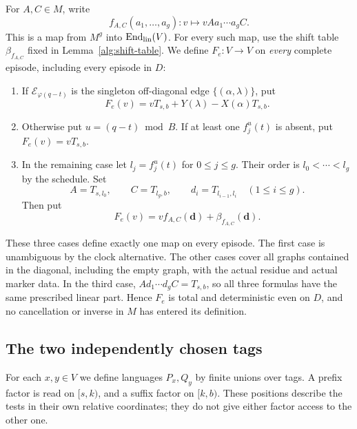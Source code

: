 For $A,C\in M$, write
\begin{equation}
 f_{A,C}(a_1,\ldots,a_g)\colon
 v\longmapsto vA a_1\cdots a_g C.
 \label{outer:product-table}
\end{equation}
This is a map from $M^g$ into $\operatorname{End}_{\rm lin}(V)$.
For every such map, use the shift table $\beta_{f_{A,C}}$ fixed in
Lemma~\ref{alg:shift-table}.  We define $F_e\colon V\to V$ on
\emph{every} complete episode, including every episode in $D$:
\begin{enumerate}
\item If $\mathcal E_{\varphi(q-t)}$ is the singleton off-diagonal edge
      $\{(\alpha,\lambda)\}$, put
      \begin{equation}
      F_e(v)=vT_{s,b}+Y(\lambda)-X(\alpha)T_{s,b}.
      \label{outer:off-diagonal-update}
      \end{equation}
\item Otherwise put $u=(q-t)\bmod B$.  If at least one
      $f_j^u(t)$ is absent, put $F_e(v)=vT_{s,b}$.
\item In the remaining case let $l_j=f_j^u(t)$ for $0\le j\le g$.
      Their order is $l_0<\cdots<l_g$ by the schedule.  Set
      \[
      A=T_{s,l_0},\qquad C=T_{l_g,b},\qquad
      d_i=T_{l_{i-1},l_i}\quad(1\le i\le g).
      \]
      Then put
      \begin{equation}
      F_e(v)=v f_{A,C}(\mathbf d)+\beta_{f_{A,C}}(\mathbf d).
      \label{outer:table-update}
      \end{equation}
\end{enumerate}
These three cases define exactly one map on every episode. The first
case is unambiguous by the clock alternative. The other cases cover all
graphs contained in the diagonal, including the empty graph, with the
actual residue and actual marker data. In the third case,
$A d_1\cdots d_g C=T_{s,b}$, so all three formulas have the same
prescribed linear part. Hence $F_e$ is total and deterministic even on
$D$, and no cancellation or inverse in $M$ has entered its definition.

\subsection{The two independently chosen tags}

For each $x,y\in V$ we define languages $P_x,Q_y$ by finite unions
over tags.  A prefix factor is read on $[s,k)$, and a suffix factor
on $[k,b)$.  These positions describe the tests in their own relative
coordinates; they do not give either factor access to the other one.

